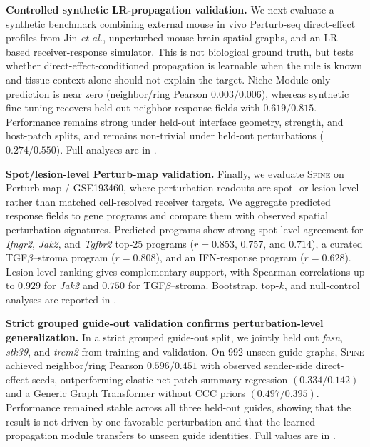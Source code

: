 \documentclass[sigconf,review,balance=false]{acmart}
\newcommand{\methodname}{\textsc{Spine}\xspace}
\begin{document}
\textbf{Controlled synthetic LR-propagation validation.}
We next evaluate a synthetic benchmark combining external mouse in vivo
Perturb-seq direct-effect profiles from Jin \textit{et al.}, unperturbed
mouse-brain spatial graphs, and an LR-based receiver-response simulator. This is
not biological ground truth, but tests whether direct-effect-conditioned
propagation is learnable when the rule is known and tissue context alone should
not explain the target. Niche Module-only prediction is near zero
(neighbor/ring Pearson $0.003/0.006$), whereas synthetic fine-tuning recovers
held-out neighbor response fields with $0.619/0.815$. Performance remains strong
under held-out interface geometry, strength, and host-patch splits, and remains
non-trivial under held-out perturbations ($0.274/0.550$). Full analyses are in
.


\textbf{Spot/lesion-level Perturb-map validation.}
Finally, we evaluate \methodname{} on Perturb-map / GSE193460, where perturbation
readouts are spot- or lesion-level rather than matched cell-resolved receiver
targets. We aggregate predicted response fields to gene programs and compare them
with observed spatial perturbation signatures. Predicted programs show strong
spot-level agreement for \textit{Ifngr2}, \textit{Jak2}, and \textit{Tgfbr2}
top-25 programs ($r=0.853$, $0.757$, and $0.714$), a curated
TGF$\beta$--stroma program ($r=0.808$), and an IFN-response program
($r=0.628$). Lesion-level ranking gives complementary support, with Spearman
correlations up to $0.929$ for \textit{Jak2} and $0.750$ for TGF$\beta$--stroma.
Bootstrap, top-$k$, and null-control analyses are reported in
.


\textbf{Strict grouped guide-out validation confirms perturbation-level generalization.}
In a strict grouped guide-out split, we jointly held out \textit{fasn}, \textit{stk39}, and \textit{trem2} from training and validation. On 992 unseen-guide graphs, \methodname{} achieved neighbor/ring Pearson $0.596/0.451$ with observed sender-side direct-effect seeds, outperforming elastic-net patch-summary regression $(0.334/0.142)$ and a Generic Graph Transformer without CCC priors $(0.497/0.395)$. Performance remained stable across all three held-out guides, showing that the result is not driven by one favorable perturbation and that the learned propagation module transfers to unseen guide identities. Full values are in .
\end{document}
